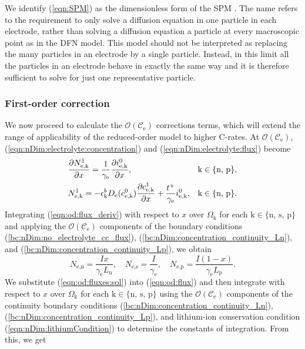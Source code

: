 \documentclass[a4paper]{article}
\newcommand{\ts}[1]{_{\text{#1}}}
\newcommand{\kin}[1]{\text{k} \in \{\text{#1}\}}
\begin{document}
We identify (\ref{eqn:SPM}) as the dimensionless form of the SPM \cite{Perez2016, Bizeray2017}. The name refers to the requirement to only solve a diffusion equation in one particle in each electrode, rather than solving a diffusion equation a particle at every macroscopic point as in the DFN model. This model should not be interpreted as replacing the many particles in an electrode by a single particle. Instead, in this limit all the particles in an electrode behave in exactly the same way and it is therefore sufficient to solve for just one representative particle.

\subsubsection{First-order correction}
We now proceed to calculate the $\mathcal{O}(\mathcal{C}\ts{e})$ corrections terms, which will extend the range of applicability of the reduced-order model to higher C-rates. At $\mathcal{O}(\mathcal{C}\ts{e})$, (\ref{eqn:nDim:electrolyte:concentration}) and (\ref{eqn:nDim:electrolyte:flux}) become
\begin{align}\label{eqn:od:flux_deriv}
  &\pdv{N\ts{e,k}^1}{x} = \frac{1}{\gamma\ts{e}}\pdv{i\ts{e,k}^0}{x}, && \kin{n, p}, \\
    \label{eqn:od:flux}
	&N\ts{e,k}^1 = -\epsilon\ts{k}^b D\ts{e}(c^0\ts{e,k}) \pdv{c^1\ts{e,k}}{x} + \frac{t^+}{\gamma\ts{e}}i\ts{e,k}^0, && \kin{n, p}.
\end{align}
Integrating (\ref{eqn:od:flux_deriv}) with respect to $x$ over $\Omega\ts{k}$ for each $\kin{n, s, p}$ and applying the $\mathcal{O}(\mathcal{C}\ts{e})$ components of the boundary conditions (\ref{bc:nDim:no_electrolyte_cc_flux}), (\ref{bc:nDim:concentration_continuity_Ln}), and (\ref{bc:nDim:concentration_continuity_Lp}), we obtain
\begin{equation}\label{eqn:od:fluxes:sol} 
  N\ts{e,n} = \frac{I x}{\gamma\ts{e} L\ts{n}}, \quad N\ts{e,s} = \frac{I}{\gamma\ts{e}}, \quad N\ts{e,p} = \frac{I (1-x)}{\gamma\ts{e} L\ts{p}}. 
\end{equation}
We substitute (\ref{eqn:od:fluxes:sol}) into (\ref{eqn:od:flux}) and then integrate with respect to $x$ over $\Omega\ts{k}$ for each $\kin{n, s, p}$ using the $\mathcal{O}(\mathcal{C}\ts{e})$ components of the continuity boundary conditions (\ref{bc:nDim:concentration_continuity_Ln}), (\ref{bc:nDim:concentration_continuity_Lp}), and lithium-ion conservation condition (\ref{eqn:nDim:lithiumCondition}) to determine the constants of integration. From this, we get
\end{document}
